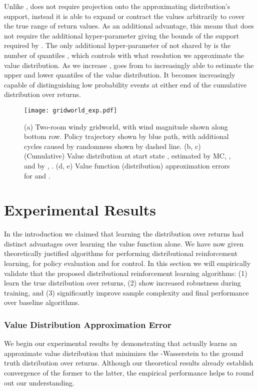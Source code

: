 \documentclass[letterpaper]{article}
\begin{document}
Unlike ,  does not require projection onto the approximating distribution's support, instead it is able to expand or contract the values arbitrarily to cover the true range of return values. As an additional advantage, this means that  does not require the additional hyper-parameter giving the bounds of the support required by . The only additional hyper-parameter of  not shared by  is the number of quantiles , which controls with what resolution we approximate the value distribution. As we increase ,  goes from  to increasingly able to estimate the upper and lower quantiles of the value distribution. It becomes increasingly capable of distinguishing low probability events at either end of the cumulative distribution over returns. 

\begin{figure*}[ht]
\begin{center}
\texttt{[image: gridworld\_exp.pdf]}
\end{center}
\caption{(a) Two-room windy gridworld, with wind magnitude shown along bottom row. Policy trajectory shown by blue path, with additional cycles caused by randomness shown by dashed line. (b, c) (Cumulative) Value distribution at start state , estimated by MC, , and by , . (d, e) Value function (distribution) approximation errors for  and . \label{fig:windy_gw}}
\end{figure*}

\section{Experimental Results}

In the introduction we claimed that learning the distribution over returns had distinct advantages over learning the value function alone. We have now given theoretically justified algorithms for performing distributional reinforcement learning,  for policy evaluation and  for control. In this section we will empirically validate that the proposed distributional reinforcement learning algorithms: (1) learn the true distribution over returns, (2) show increased robustness during training, and (3) significantly improve sample complexity and final performance over baseline algorithms.

\subsubsection{Value Distribution Approximation Error}

We begin our experimental results by demonstrating that  actually learns an approximate value distribution that minimizes the -Wasserstein to the ground truth distribution over returns. Although our theoretical results already establish convergence of the former to the latter, the empirical performance helps to round out our understanding.
\end{document}

